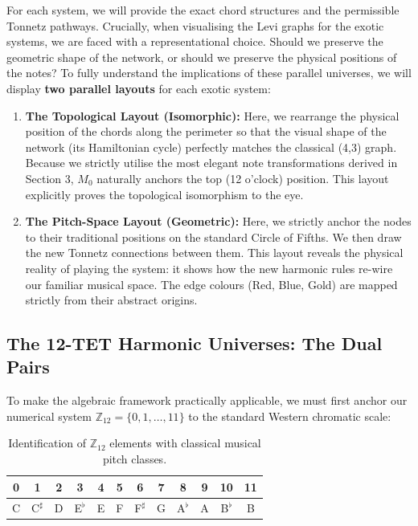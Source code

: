 \documentclass[11pt,letterpaper]{amsart}
\newcommand{\Z}{\mathbb{Z}}
\begin{document}
For each system, we will provide the exact chord structures and the permissible Tonnetz pathways. Crucially, when visualising the Levi graphs for the exotic systems, we are faced with a representational choice. Should we preserve the geometric shape of the network, or should we preserve the physical positions of the notes? To fully understand the implications of these parallel universes, we will display \textbf{two parallel layouts} for each exotic system:

\begin{enumerate}
    \item \textbf{The Topological Layout (Isomorphic):} Here, we rearrange the physical position of the chords along the perimeter so that the visual shape of the network (its Hamiltonian cycle) perfectly matches the classical (4,3) graph. Because we strictly utilise the most elegant note transformations derived in Section 3, $M_0$ naturally anchors the top (12 o'clock) position. This layout explicitly proves the topological isomorphism to the eye.
    \item \textbf{The Pitch-Space Layout (Geometric):} Here, we strictly anchor the nodes to their traditional positions on the standard Circle of Fifths. We then draw the new Tonnetz connections between them. This layout reveals the physical reality of playing the system: it shows how the new harmonic rules re-wire our familiar musical space. The edge colours (Red, Blue, Gold) are mapped strictly from their abstract origins.
\end{enumerate}

\subsection{The 12-TET Harmonic Universes: The Dual Pairs}

To make the algebraic framework practically applicable, we must first anchor our numerical system $\Z_{12} = \{0, 1, \dots, 11\}$ to the standard Western chromatic scale:

{\tiny \begin{table}[H]
    \centering
    \begin{tabular}{cccccccccccc}
    \toprule
    \textbf{0} & \textbf{1} & \textbf{2} & \textbf{3} & \textbf{4} & \textbf{5} & \textbf{6} & \textbf{7} & \textbf{8} & \textbf{9} & \textbf{10} & \textbf{11} \\
    \midrule
    C & C$^\sharp$ & D & E$^\flat$ & E & F & F$^\sharp$ & G & A$^\flat$ & A & B$^\flat$ & B \\
    \bottomrule
    \end{tabular}
    \caption{Identification of $\Z_{12}$ elements with classical musical pitch classes.}
\end{table}}
\end{document}

